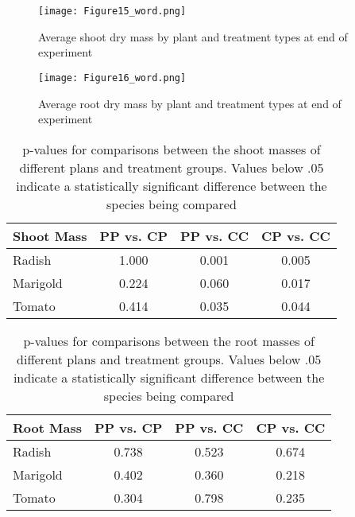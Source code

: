 \begin{figure}[htbp]
  \centering
  \texttt{[image: Figure15\_word.png]}
  \caption{Average shoot dry mass by plant and treatment types at end of experiment}
  \label{fig:shoots}
\end{figure}

\begin{figure}[htbp]
  \centering
  \texttt{[image: Figure16\_word.png]}
  \caption{Average root dry mass by plant and treatment types at end of experiment}
  \label{fig:roots}
\end{figure}

\begin{table}[htpb]
  \begin{center}
    \begin{tabular}{|l |c |c |c |}
      \hline
      Shoot Mass & PP vs. CP & PP vs. CC & CP vs. CC \\\hline
      Radish & 1.000 & 0.001 & 0.005 \\\hline
      Marigold & 0.224 & 0.060 & 0.017 \\\hline
      Tomato & 0.414 & 0.035 & 0.044 \\\hline
    \end{tabular}
  \end{center}
  \caption{p-values for comparisons between the shoot masses of different plans and treatment groups. Values below .05 indicate a statistically significant difference between the species being compared}
  \label{tab:shoot_t}
\end{table}

\begin{table}[htpb]
  \begin{center}
    \begin{tabular}{|l |c |c |c |}
      \hline
      Root Mass & PP vs. CP & PP vs. CC & CP vs. CC \\\hline
      Radish & 0.738 & 0.523 & 0.674 \\\hline
      Marigold & 0.402 & 0.360 & 0.218 \\\hline
      Tomato & 0.304 & 0.798 & 0.235 \\\hline
    \end{tabular}
  \end{center}
  \caption{p-values for comparisons between the root masses of different plans and treatment groups. Values below .05 indicate a statistically significant difference between the species being compared}
  \label{tab:root_t}
\end{table}

